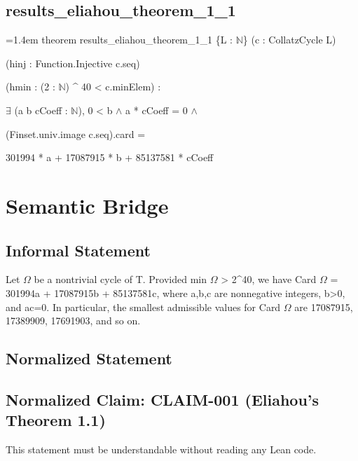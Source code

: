 \documentclass[11pt]{article}
\begin{document}
\subsection*{results\_eliahou\_theorem\_1\_1}
{\footnotesize\ttfamily\raggedright\hangindent=1.4em\noindent
\hspace*{0.00em}theorem results\_\allowbreak{}eliahou\_\allowbreak{}theorem\_\allowbreak{}1\_\allowbreak{}1 \{L : \ensuremath{\mathbb{N}}\} (c : CollatzCycle L)\par
\hspace*{2.20em}(hinj : Function.\allowbreak{}Injective c.\allowbreak{}seq)\par
\hspace*{2.20em}(hmin : (2 : \ensuremath{\mathbb{N}}) \textasciicircum{} 40 < c.\allowbreak{}minElem) :\par
\hspace*{2.20em}\ensuremath{\exists} (a b cCoeff : \ensuremath{\mathbb{N}}), 0 < b \ensuremath{\wedge} a * cCoeff = 0 \ensuremath{\wedge}\par
\hspace*{3.30em}(Finset.\allowbreak{}univ.\allowbreak{}image c.\allowbreak{}seq).\allowbreak{}card =\par
\hspace*{4.40em}301994 * a + 17087915 * b + 85137581 * cCoeff\par
}

\section{Semantic Bridge}
\subsection*{Informal Statement}
Let \ensuremath{\Omega} be a nontrivial cycle of T. Provided min \ensuremath{\Omega} > 2\textasciicircum{}40, we have Card \ensuremath{\Omega} = 301994a + 17087915b + 85137581c, where a,b,c are nonnegative integers, b>0, and ac=0. In particular, the smallest admissible values for Card \ensuremath{\Omega} are 17087915, 17389909, 17691903, and so on.
\subsection*{Normalized Statement}
\subsection*{Normalized Claim: CLAIM-001 (Eliahou's Theorem 1.1)}
This statement must be understandable without reading any Lean code.
\end{document}
